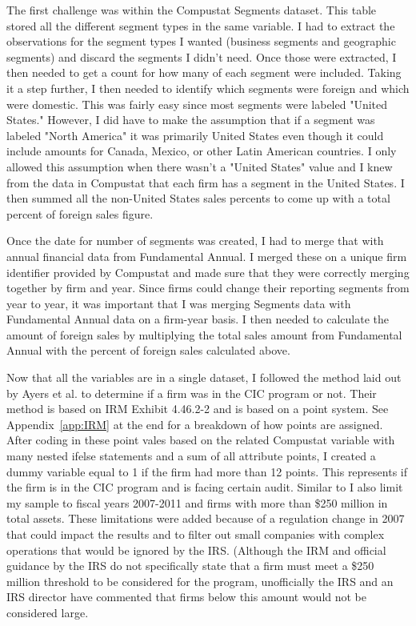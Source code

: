 \documentclass[12pt]{article}
\begin{document}
The first challenge was within the Compustat Segments dataset. This table stored all the different segment types in the same variable. I had to extract the observations for the segment types I wanted (business segments and geographic segments) and discard the segments I didn't need. Once those were extracted, I then needed to get a count for how many of each segment were included. Taking it a step further, I then needed to identify which segments were foreign and which were domestic. This was fairly easy since most segments were labeled "United States." However, I did have to make the assumption that if a segment was labeled "North America" it was primarily United States even though it could include amounts for Canada, Mexico, or other Latin American countries. I only allowed this assumption when there wasn't a "United States" value and I knew from the data in Compustat that each firm has a segment in the United States. I then summed all the non-United States sales percents to come up with a total percent of foreign sales figure.
\vspace{\baselineskip}

Once the date for number of segments was created, I had to merge that with annual financial data from Fundamental Annual. I merged these on a unique firm identifier provided by Compustat and made sure that they were correctly merging together by firm and year. Since firms could change their reporting segments from year to year, it was important that I was merging Segments data with Fundamental Annual data on a firm-year basis. I then needed to calculate the amount of foreign sales by multiplying the total sales amount from Fundamental Annual with the percent of foreign sales calculated above.
\vspace{\baselineskip}

Now that all the variables are in a single dataset, I followed the method laid out by Ayers et al. to determine if a firm was in the CIC program or not.\citep{Ayers2019} Their method is based on IRM Exhibit 4.46.2-2 and is based on a point system. See Appendix~\ref{app:IRM} at the end for a breakdown of how points are assigned. After coding in these point vales based on the related Compustat variable with many nested ifelse statements and a sum of all attribute points, I created a dummy variable equal to 1 if the firm had more than 12 points. This represents if the firm is in the CIC program and is facing certain audit. Similar to \citep{Ayers2019} I also limit my sample to fiscal years 2007-2011 and firms with more than \$250 million in total assets. These limitations were added because of a regulation change in 2007 that could impact the results and to filter out small companies with complex operations that would be ignored by the IRS. (Although the IRM and official guidance by the IRS do not specifically state that a firm must meet a \$250 million threshold to be considered for the program, unofficially the IRS and an IRS director have commented that firms below this amount would not be considered large.
\vspace{\baselineskip}
\end{document}
